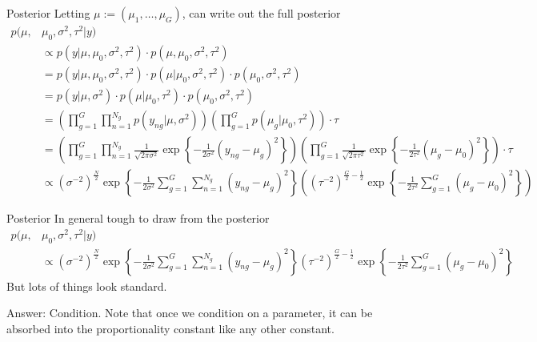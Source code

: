 \documentclass[aspectratio=169, handout]{beamer}
\begin{document}
{\footnotesize
\begin{frame}{Posterior}
Letting $\mu:=(\mu_1,\ldots,\mu_G)$, can write out the full posterior
\begin{align*}
  p(\mu,&\mu_0,\sigma^2, \tau^2|y)
  \\
  &\propto
  p(y|\mu,\mu_0, \sigma^2,  \tau^2)
  \cdot p(\mu,\mu_0, \sigma^2,  \tau^2)
  \\
  &=
  p(y|\mu,\mu_0, \sigma^2,  \tau^2)
  \cdot p(\mu|\mu_0, \sigma^2,  \tau^2)
  \cdot p(\mu_0, \sigma^2,  \tau^2)
  \\
  &=
  p(y|\mu, \sigma^2)
  \cdot p(\mu|\mu_0, \tau^2)
  \cdot p(\mu_0, \sigma^2,  \tau^2)
  \\
  &=
  \left(
  \prod_{g=1}^G
  \prod_{n=1}^{N_g}
  p(y_{ng}|\mu,\sigma^2)
  \right)
  \left(
  \prod_{g=1}^G
  p(\mu_g|\mu_0,\tau^2)
  \right)
  \cdot \tau
  \\
  &=
  \left(
  \prod_{g=1}^G
  \prod_{n=1}^{N_g}
  \frac{1}{\sqrt{2\pi\sigma^2}}
  \exp\left\{
    -
    \frac{1}{2\sigma^2}
    (y_{ng}-\mu_g)^2
  \right\}
  \right)
  \left(
  \prod_{g=1}^G
  \frac{1}{\sqrt{2\pi\tau^2}}
  \exp\left\{
    -
    \frac{1}{2\tau^2}
    (\mu_g-\mu_0)^2
  \right\}
  \right)
  \cdot \tau
  \\
  &\propto
  (\sigma^{-2})^{\frac{N}{2}}
  \exp\left\{
    -
    \frac{1}{2\sigma^2}
    \sum_{g=1}^G
    \sum_{n=1}^{N_g}
    (y_{ng}-\mu_g)^2
  \right\}
  \left(
  (\tau^{-2})^{\frac{G}{2}-\frac{1}{2}}
  \exp\left\{
    -
    \frac{1}{2\tau^2}
    \sum_{g=1}^G
    (\mu_g-\mu_0)^2
  \right\}
  \right)
\end{align*}
\end{frame}
}


{\footnotesize
\begin{frame}{Posterior}
In general tough to draw from the posterior
\begin{align*}
  p(\mu,&\mu_0,\sigma^2, \tau^2|y)
  \\
  &\propto
  (\sigma^{-2})^{\frac{N}{2}}
  \exp\left\{
    -
    \frac{1}{2\sigma^2}
    \sum_{g=1}^G
    \sum_{n=1}^{N_g}
    (y_{ng}-\mu_g)^2
  \right\}
  (\tau^{-2})^{\frac{G}{2}-\frac{1}{2}}
  \exp\left\{
    -
    \frac{1}{2\tau^2}
    \sum_{g=1}^G
    (\mu_g-\mu_0)^2
  \right\}
\end{align*}
But lots of things look standard.

Answer: \alert{Condition}.
Note that once we condition on a parameter, it can be absorbed into the
proportionality constant like any other constant.
\end{frame}
}
\end{document}
